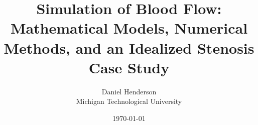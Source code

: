 \title{Simulation of Blood Flow:\\
\large Mathematical Models, Numerical Methods, and an Idealized Stenosis Case Study}
\author{Daniel Henderson\\ Michigan Technological University}
\date{\today}
